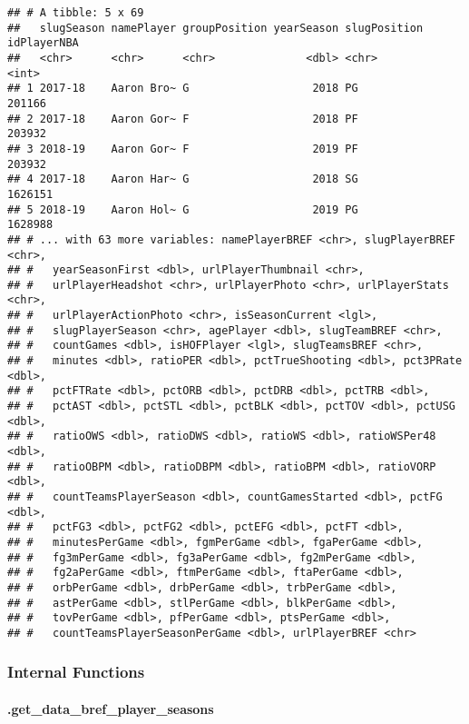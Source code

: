 \documentclass[]{article}
\let\oldparagraph\paragraph
\renewcommand{\paragraph}[1]{\oldparagraph{#1}\mbox{}}
\begin{document}
\begin{verbatim}
## # A tibble: 5 x 69
##   slugSeason namePlayer groupPosition yearSeason slugPosition idPlayerNBA
##   <chr>      <chr>      <chr>              <dbl> <chr>              <int>
## 1 2017-18    Aaron Bro~ G                   2018 PG                201166
## 2 2017-18    Aaron Gor~ F                   2018 PF                203932
## 3 2018-19    Aaron Gor~ F                   2019 PF                203932
## 4 2017-18    Aaron Har~ G                   2018 SG               1626151
## 5 2018-19    Aaron Hol~ G                   2019 PG               1628988
## # ... with 63 more variables: namePlayerBREF <chr>, slugPlayerBREF <chr>,
## #   yearSeasonFirst <dbl>, urlPlayerThumbnail <chr>,
## #   urlPlayerHeadshot <chr>, urlPlayerPhoto <chr>, urlPlayerStats <chr>,
## #   urlPlayerActionPhoto <chr>, isSeasonCurrent <lgl>,
## #   slugPlayerSeason <chr>, agePlayer <dbl>, slugTeamBREF <chr>,
## #   countGames <dbl>, isHOFPlayer <lgl>, slugTeamsBREF <chr>,
## #   minutes <dbl>, ratioPER <dbl>, pctTrueShooting <dbl>, pct3PRate <dbl>,
## #   pctFTRate <dbl>, pctORB <dbl>, pctDRB <dbl>, pctTRB <dbl>,
## #   pctAST <dbl>, pctSTL <dbl>, pctBLK <dbl>, pctTOV <dbl>, pctUSG <dbl>,
## #   ratioOWS <dbl>, ratioDWS <dbl>, ratioWS <dbl>, ratioWSPer48 <dbl>,
## #   ratioOBPM <dbl>, ratioDBPM <dbl>, ratioBPM <dbl>, ratioVORP <dbl>,
## #   countTeamsPlayerSeason <dbl>, countGamesStarted <dbl>, pctFG <dbl>,
## #   pctFG3 <dbl>, pctFG2 <dbl>, pctEFG <dbl>, pctFT <dbl>,
## #   minutesPerGame <dbl>, fgmPerGame <dbl>, fgaPerGame <dbl>,
## #   fg3mPerGame <dbl>, fg3aPerGame <dbl>, fg2mPerGame <dbl>,
## #   fg2aPerGame <dbl>, ftmPerGame <dbl>, ftaPerGame <dbl>,
## #   orbPerGame <dbl>, drbPerGame <dbl>, trbPerGame <dbl>,
## #   astPerGame <dbl>, stlPerGame <dbl>, blkPerGame <dbl>,
## #   tovPerGame <dbl>, pfPerGame <dbl>, ptsPerGame <dbl>,
## #   countTeamsPlayerSeasonPerGame <dbl>, urlPlayerBREF <chr>
\end{verbatim}

\subsubsection{Internal Functions}\label{internal-functions}

\paragraph{.get\_data\_bref\_player\_seasons}\label{get_data_bref_player_seasons}
\end{document}
